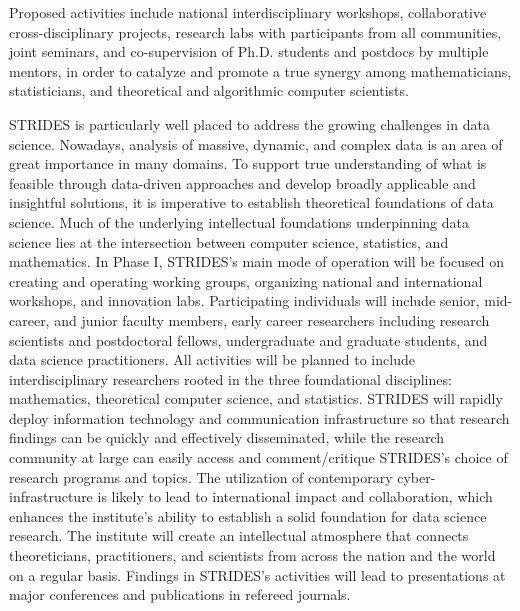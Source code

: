 \documentclass[12pt]{article}
\begin{document}
Proposed activities include national interdisciplinary workshops, collaborative
cross-disciplinary projects, research labs with participants from all communities,
joint seminars, and co-supervision of Ph.D. students and postdocs by multiple mentors,
in order to catalyze and promote a true synergy among mathematicians, statisticians,
and theoretical and algorithmic computer scientists.

STRIDES is particularly well placed to address the growing challenges in data science.
Nowadays, analysis of massive, dynamic, and complex data is an area of great importance
in many domains. To support true understanding of what is feasible through data-driven
approaches and develop broadly applicable and insightful solutions, it is imperative to
establish theoretical foundations of data science. Much of the underlying intellectual
foundations underpinning data science lies at the intersection between computer science, statistics, and mathematics.
In Phase I, STRIDES's main mode of operation will be focused on creating and operating
working groups, organizing national and international workshops, and innovation labs.
Participating individuals will include senior, mid-career, and junior faculty members,
early career researchers including research scientists and postdoctoral fellows,
undergraduate and graduate students, and data science practitioners.
All activities will be planned to include interdisciplinary researchers rooted in the
three foundational disciplines: mathematics, theoretical computer science, and statistics.
STRIDES will rapidly deploy information technology and communication infrastructure so that
research findings can be quickly and effectively disseminated, while the research community
at large can easily access and comment/critique STRIDES's choice of research programs and topics.
The utilization of contemporary cyber-infrastructure is likely to lead to international impact
and collaboration, which enhances the institute's ability to establish a solid foundation for
data science research. The institute will create an intellectual atmosphere that connects
theoreticians, practitioners, and scientists from across the nation and the world on a
regular basis. Findings in STRIDES's activities will lead to presentations at major conferences
and publications in refereed journals.
\end{document}
